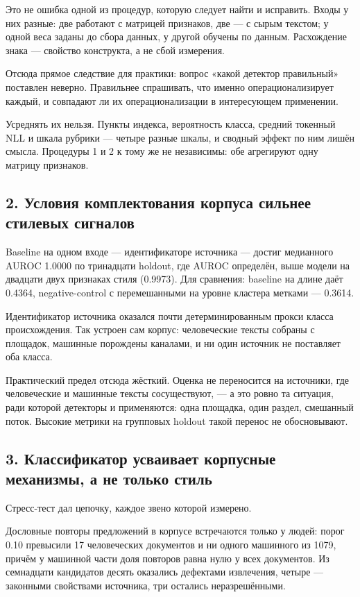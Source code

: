 \documentclass[11pt,a4paper]{article}
\renewcommand{\_}{\textunderscore\allowbreak}
\begin{document}
Это не ошибка одной из процедур, которую следует найти и исправить. Входы у них
разные: две работают с матрицей признаков, две — с сырым текстом; у одной веса
заданы до сбора данных, у другой обучены по данным. Расхождение знака — свойство
конструкта, а не сбой измерения.

Отсюда прямое следствие для практики: вопрос «какой детектор правильный» поставлен
неверно. Правильнее спрашивать, что именно операционализирует каждый, и совпадают
ли их операционализации в интересующем применении.

Усреднять их нельзя. Пункты индекса, вероятность класса, средний токенный NLL и
шкала рубрики — четыре разные шкалы, и сводный эффект по ним лишён смысла.
Процедуры 1 и 2 к тому же не независимы: обе агрегируют одну матрицу признаков.

\subsection{2. Условия комплектования корпуса сильнее стилевых сигналов}

Baseline на одном входе — идентификаторе источника — достиг медианного AUROC
1.0000 по тринадцати holdout, где AUROC определён, выше модели на двадцати
двух признаках стиля (0.9973). Для сравнения: baseline на длине даёт 0.4364, negative-control с
перемешанными на уровне кластера метками — 0.3614.

Идентификатор источника оказался почти детерминированным прокси класса
происхождения. Так устроен сам корпус: человеческие тексты собраны с площадок,
машинные порождены каналами, и ни один источник не поставляет оба класса.

Практический предел отсюда жёсткий. Оценка не переносится на источники, где
человеческие и машинные тексты сосуществуют, — а это ровно та ситуация, ради
которой детекторы и применяются: одна площадка, один раздел, смешанный поток.
Высокие метрики на групповых holdout такой перенос не обосновывают.

\subsection{3. Классификатор усваивает корпусные механизмы, а не только стиль}

Стресс-тест дал цепочку, каждое звено которой измерено.

Дословные повторы предложений в корпусе встречаются только у людей: порог 0.10
превысили 17 человеческих документов и ни одного машинного из 1079, причём у
машинной части доля повторов равна нулю у всех документов. Из семнадцати
кандидатов десять оказались дефектами извлечения, четыре — законными свойствами
источника, три остались неразрешёнными.
\end{document}
